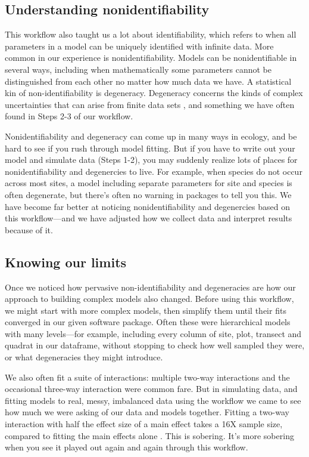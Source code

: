 \documentclass[11pt]{article}
\begin{document}
\subsection*{Understanding nonidentifiability}
This workflow also taught us a lot about identifiability, which refers to when all parameters in a model can be uniquely identified with infinite data. More common in our experience is nonidentifiability. Models can be nonidentifiable in several ways, including when mathematically some parameters cannot be distinguished from each other no matter how much data we have. 
A statistical kin of non-identifiability is degeneracy.  Degeneracy concerns the kinds of complex uncertainties that can arise from finite data sets \citep{gelmanhill}, and something we have often found in Steps 2-3 of our workflow.


Nonidentifiability and degeneracy can come up in many ways in ecology, and be hard to see if you rush through model fitting. But if you have to write out your model and simulate data (Steps 1-2), you may suddenly realize lots of places for nonidentifiability and degenercies to live. For example, when species do not occur across most sites, a model including separate parameters for site and species is often degenerate, but there's often no warning in packages to tell you this. We have become far better at noticing nonidentifiability and degenercies based on this workflow---and we have adjusted how we collect data and interpret results because of it. 

 \subsection*{Knowing our limits}  
Once we noticed how pervasive non-identifiability and degeneracies are how our approach to building complex models also changed.
Before using this workflow, we might start with more complex models, then simplify them until their fits converged in our given software package. Often these were hierarchical models with many levels---for example, including every column of site, plot, transect and quadrat in our dataframe, without stopping to check how well sampled they were, or what degeneracies they might introduce. 

We also often fit a suite of interactions: multiple two-way interactions and the occasional three-way interaction were common fare. But in simulating data, and fitting models to real, messy, imbalanced data using the workflow we came to see how much we were asking of our data and models together. Fitting a two-way interaction with half the effect size of a main effect takes a 16X sample size, compared to fitting the main effects alone \citep[the main effects then average over the interactions, see][for more details]{regotherstories}. This is sobering. It's more sobering when you see it played out again and again through this workflow. 
\end{document}
